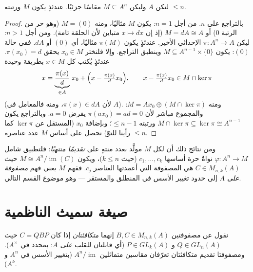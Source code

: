 \begin{theorem}\label{thm:b3:modules:submodule}
لتكن $A$  وليكن $M \subseteq A^n$ مقاسًا جزئيًا. عندئذٍ
يكون $M$  ورتبته $\leq n$.
\end{theorem}

\begin{proof}
بالتراجع على $n$. من أجل $n = 1$: يكون $M$ مثاليًا، ومنه $M = (0)$
(وهو حر من الرتبة $0$) أو $M = dA \cong A$ (إذ إن $x \mapsto dx$
متباين لأن الحلقة تامة). ومن أجل $n > 1$: ليكن $\pi \colon A^n \to A$ الإحداثي
الأخير. عندئذٍ يكون $\pi(M)$ مثاليًا، أي $(0)$ أو $dA$. ففي حالة
$(0)$: يكون $M \subseteq A^{n-1} \times \{0\}$ وينطبق التراجع. وإلا فلنختر $x_0 \in M$ يحقق
$\pi(x_0) = d$. عندئذٍ يُكتب كل $x \in M$ بطريقة وحيدة
\[
x = \underbrace{\frac{\pi(x)}{d}}_{\in A}\, x_0 +
\Bigl(x - \tfrac{\pi(x)}d x_0\Bigr),
\qquad x - \tfrac{\pi(x)}d x_0 \in M \cap \ker\pi
\]
(لأن $\pi(x) \in dA$، ومنه فالمعامل في $A$). ومنه $M = Ax_0
\oplus (M \cap \ker \pi)$: والمجموع
مباشر لأن $\pi(ax_0) =
ad = 0$ يفرض $a = 0$. وبالتراجع يكون $M \cap \ker\pi \subseteq
\ker \pi \cong A^{n-1}$  ورتبته
$\leq n - 1$؛ وبإضافة $x_0$ (المستقل عن $\ker\pi$ كما رأينا للتوّ)
نحصل على أساس  $M$ عدد عناصره $\leq n$.
\end{proof}

\begin{remark}\label{rem:b3:modules:presentation}
ومن نتائج ذلك أن لكل  $M$ مولَّد بعدد منتهٍ على  \emph{تقديمًا منتهيًا}: فلتطبيق شامل $\varphi\colon A^n \to M$ نواةٌ حرة أساسها
$c_1, \dots, c_k$ (حيث $k \leq n$)، ويكون $M
\cong A^n / \operatorname{im}(C)$ حيث $C \in M_{n,k}(A)$ هي المصفوفة التي
أعمدتها العناصر $c_j$. ففهم $M$ يعني فهم \emph{مصفوفة على $A$}
إلى حدود تغيير الأسس في المنطلق والمستقر --- وهو موضوع القسم
التالي.
\end{remark}

\section{صيغة سميث الناظمية}

\begin{definition}\label{def:b3:modules:equivalence}
نقول عن مصفوفتين $B, C \in M_{n,k}(A)$ إنهما \emph{متكافئتان} إذا كان $C =
QBP$ حيث
$Q \in GL_n(A)$ و $P \in GL_k(A)$ (أي قابلتان للقلب \emph{على
$A$}: بمحدد في $A^\times$). ومصفوفتا تقديم متكافئتان تعرّفان
مقاسين متماثلين $A^n/
\operatorname{im}$ (بتغيير الأسس في $A^n$ و $A^k$).
\end{definition}

